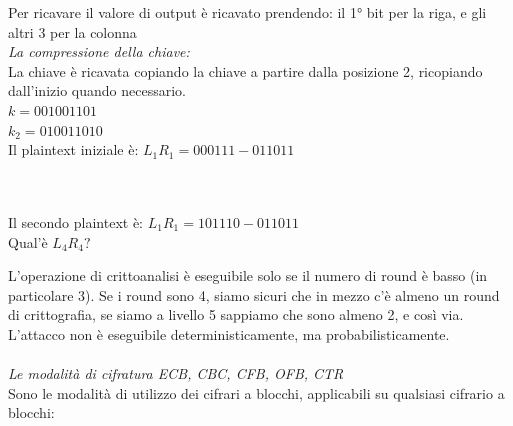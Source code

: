 \documentclass[11pt, oneside]{article}   	%
\begin{document}
Per ricavare il valore di output è ricavato prendendo: il 1° bit per la riga, e gli altri 3 per la colonna\\
\emph{La compressione della chiave:}\\
La chiave è ricavata copiando la chiave a partire dalla posizione 2, ricopiando dall'inizio quando necessario.\\
\(k = 001001101\)\\
\(k_2 = 010011010\)\\
Il plaintext iniziale è: \(L_1R_1 = 000111-011011\) \\\\\

Il secondo plaintext è: \(L_1R_1 = 101110-011011\)\\
Qual'è \(L_4R_4?\)

L'operazione di crittoanalisi è eseguibile solo se il numero di round è basso (in particolare 3). Se i round sono 4, siamo sicuri che in mezzo c'è almeno un round di crittografia, se siamo a livello 5 sappiamo che sono almeno 2, e così via. L'attacco non è eseguibile deterministicamente, ma probabilisticamente.
\\\\
\emph{Le modalità di cifratura ECB, CBC, CFB, OFB, CTR}\\
Sono le modalità di utilizzo dei cifrari a blocchi, applicabili su qualsiasi cifrario a blocchi:
\end{document}

